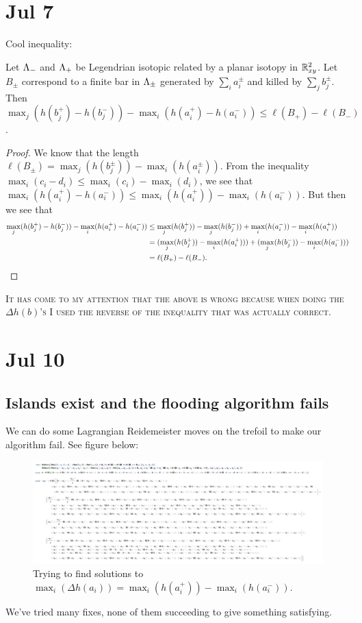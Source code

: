 \documentclass[11pt,oneside]{amsart}
\begin{document}
\section{Jul 7}

Cool inequality:
\begin{theorem}
    Let $\Lambda_-$ and $\Lambda_+$ be Legendrian isotopic related by a planar isotopy in $\mathbb R^2_{xy}$. Let $B_\pm$ correspond to a finite bar in $\Lambda_\pm$ generated by $\sum_{i}a_i^{\pm}$ and killed by $\sum_{j}b_j^{\pm}$. Then $\max_j(h(b_j^+)-h(b_j^-))-\max_i(h(a_i^+)-h(a_i^-))\leq \ell(B_+)-\ell(B_-)$.
\end{theorem}
\begin{proof}
    We know that the length $\ell(B_\pm)=\max_j(h(b_j^\pm))-\max_i(h(a_i^\pm))$. From the inequality $\max_i(c_i-d_i)\leq \max_i(c_i)-\max_i(d_i)$, we see that $\max_i(h(a_i^+)-h(a_i^-))\leq \max_i(h(a_i^+))-\max_i(h(a_i^-))$. But then we see that
    \begin{align*}
        \max_j(h(b_j^+)-h(b_j^-))-\max_i(h(a_i^+)-h(a_i^-))&\leq \max_j(h(b_j^+))-\max_j(h(b_j^-))+\max_i(h(a_i^-))-\max_i(h(a_i^+))\\&=(\max_j(h(b_j^+))-\max_i(h(a_i^+)))+(\max_j(h(b_j^-))-\max_i(h(a_i^-)))\\&=\ell(B_+)-\ell(B_-).\qedhere
    \end{align*}
\end{proof}

{\color{red}\textsc{It has come to my attention that the above is wrong because when doing the $\Delta h(b)$'s I used the reverse of the inequality that was actually correct.}}

\section{Jul 10}
\subsection{Islands exist and the flooding algorithm fails}
We can do some Lagrangian Reidemeister moves on the trefoil to make our algorithm fail. See figure below:
\begin{figure}
    \centering
    \includegraphics{Journals/mathematicastuff.png}
    \caption{Trying to find solutions to $\max_i(\Delta h(a_i))=\max_i(h(a_i^+))-\max_i(h(a_i^-))$.}
    \label{fig:failure}
\end{figure}
We've tried many fixes, none of them succeeding to give something satisfying.
\end{document}
